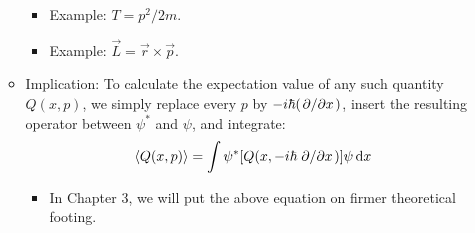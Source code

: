 \documentclass[../notes.tex]{subfiles}
\begin{document}
\begin{itemize}
\begin{itemize}
        \begin{itemize}
            \item Example: $T=p^2/2m$.
            \item Example: $\vec{L}=\vec{r}\times\vec{p}$.
        \end{itemize}
        \item Implication: To calculate the expectation value of any such quantity $Q(x,p)$, we simply replace every $p$ by $-i\hbar(\pdv*{x})$, insert the resulting operator between $\psi^*$ and $\psi$, and integrate:
        \begin{equation*}
            \langle{Q(x,p)}\rangle = \int\psi^*[Q(x,-i\hbar\pdv*{x})]\psi\dd{x}
        \end{equation*}
        \begin{itemize}
            \item In Chapter 3, we will put the above equation on firmer theoretical footing.
        \end{itemize}
    \end{itemize}
\end{itemize}
\end{document}
